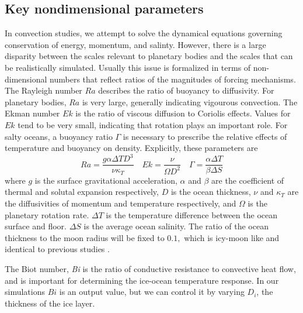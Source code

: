 \documentclass[12pt]{article}
\begin{document}
\subsection{Key nondimensional parameters}
In convection studies, we attempt to solve the dynamical equations governing conservation of energy, momentum, and salinty. However, there is a large disparity between the scales relevant to planetary bodies and the scales that can be realistically simulated. 
Usually this issue is formalized in terms of non-dimensional numbers that reflect ratios of the magnitudes of forcing mechanisms. %
The Rayleigh number $Ra$ describes the ratio of buoyancy to diffusivity. For planetary bodies, $Ra$ is very large, generally indicating vigourous convection.
The Ekman number $Ek$ is the ratio of viscous diffusion to Coriolis effects. Values for $Ek$ tend to be very small, indicating that rotation plays an important role.
For salty oceans, a buoyancy ratio $\Gamma$ is necessary to prescribe the relative effects of temperature and buoyancy on density.
Explicitly, these parameters are
\[Ra = \frac{g\alpha\Delta T D^{3}}{\nu\kappa_{T}}\quad Ek = \frac{\nu}{\Omega D^{2}}\quad \Gamma = \frac{\alpha\Delta T}{\beta \Delta S}\]%
where $g$ is the surface gravitational acceleration, $\alpha$ and $\beta$ are the coefficient of thermal and solutal expansion respectively, $D$ is the ocean thickness, $\nu$ and $\kappa_T$ are the diffusivities of momentum and temperature respectively, and $\Omega$ is the planetary rotation rate.
$\Delta T$ is the temperature difference between the ocean surface and floor. $\Delta S$ is the average ocean salinity. 
The ratio of the ocean thickness to the moon radius will be fixed to $0.1,$ which is icy-moon like and identical to previous studies \citep{dL23,kS19}.

The Biot number, \textit{Bi}\citep{jL24} is the ratio of conductive resistance to convective heat flow, and is important for determining the ice-ocean temperature response.
In our simulations $Bi$ is an output value, but we can control it by varying $D_{i}$, the thickness of the ice layer. 
\end{document}
